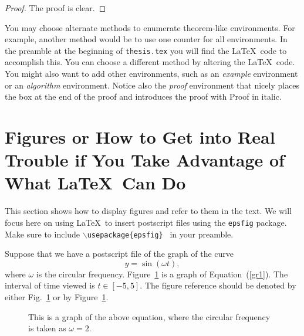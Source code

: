 \begin{proof}
The proof is clear.
\end{proof}

You may choose alternate methods to enumerate theorem-like
environments.  For example, another method would be to use one counter
for all environments.  
In  the preamble at the  beginning of  {\tt thesis.tex} 
you will find the \LaTeX\ code to accomplish this.
You can choose a different method by altering the \LaTeX\ code.
You might also want to add other environments, such as an 
{\em example} environment or an {\em algorithm} environment.
Notice also the {\em proof} environment that nicely places the box at
the end of the proof and introduces the proof with Proof in italic.

\section{Figures or How to Get into Real Trouble if You Take Advantage
of What \LaTeX\ Can Do}
\label{s:figures}

This section shows how to display figures and refer to them in the text.
We will focus here on using \LaTeX\ to insert postscript files using the
{\tt epsfig} package.  Make sure to include
{\tt $\backslash$usepackage\{epsfig\} } in your preamble.

Suppose that we have a postscript file of the  graph of the curve
\begin{equation}
y=\sin(\omega t), \label{gr1}
\end{equation}
where $\omega$ is the circular frequency.
Figure~\ref{fig1} is a graph of Equation~(\ref{gr1}). The interval
of time viewed is $t \in [-5,5]$. The figure reference should be denoted
by either Fig.~\ref{fig1} or by Figure~\ref{fig1}.
\begin{figure}[htb]
\centering
\begin{minipage}{4.5in}
\caption{This is a graph of the above equation, where the
circular frequency is taken as $\omega = 2$.\label{fig1}}
\end{minipage}
\end{figure}

